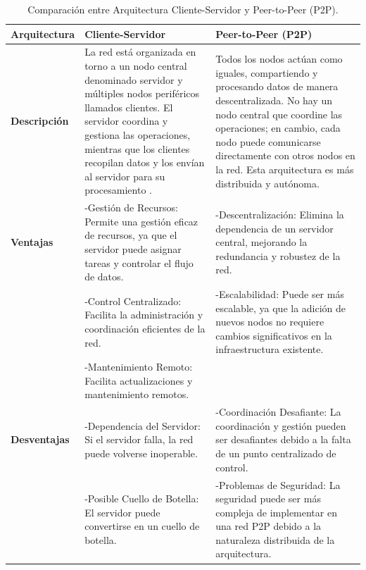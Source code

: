 \begin{table}[H]
\centering
\caption{Comparación entre Arquitectura Cliente-Servidor y Peer-to-Peer (P2P).}
\begin{tabular}{|p{2.5cm}|p{6.5cm}|p{6.5cm}|}
\hline
\cellcolor[HTML]{C0C0C0}\textbf{Arquitectura} & \cellcolor[HTML]{C0C0C0}\textbf{Cliente-Servidor} & \cellcolor[HTML]{C0C0C0}\textbf{Peer-to-Peer (P2P)} \\
\hline
\textbf{Descripción} &
La red está organizada en torno a un nodo central denominado \textquotedbl{}servidor\textquotedbl{} y múltiples nodos periféricos llamados \textquotedbl{}clientes\textquotedbl{}. El servidor coordina y gestiona las operaciones, mientras que los clientes recopilan datos y los envían al servidor para su procesamiento \cite{clienteservidor}.
&
Todos los nodos actúan como iguales, compartiendo y procesando datos de manera descentralizada. No hay un nodo central que coordine las operaciones; en cambio, cada nodo puede comunicarse directamente con otros nodos en la red. Esta arquitectura es más distribuida y autónoma\cite{p2p}.
\\
\hline
\textbf{Ventajas} &
-Gestión de Recursos: Permite una gestión eficaz de recursos, ya que el servidor puede asignar tareas y controlar el flujo de datos.
&
-Descentralización: Elimina la dependencia de un servidor central, mejorando la redundancia y robustez de la red.
\\
&
-Control Centralizado: Facilita la administración y coordinación eficientes de la red.
&
-Escalabilidad: Puede ser más escalable, ya que la adición de nuevos nodos no requiere cambios significativos en la infraestructura existente.
\\
&
-Mantenimiento Remoto: Facilita actualizaciones y mantenimiento remotos.
&
\\
\hline
\textbf{Desventajas} &
-Dependencia del Servidor: Si el servidor falla, la red puede volverse inoperable.
&
-Coordinación Desafiante: La coordinación y gestión pueden ser desafiantes debido a la falta de un punto centralizado de control.
\\
&
-Posible Cuello de Botella: El servidor puede convertirse en un cuello de botella.
&
-Problemas de Seguridad: La seguridad puede ser más compleja de implementar en una red P2P debido a la naturaleza distribuida de la arquitectura.
\\
\hline
\end{tabular}
\label{tablaarqui}
\end{table}


